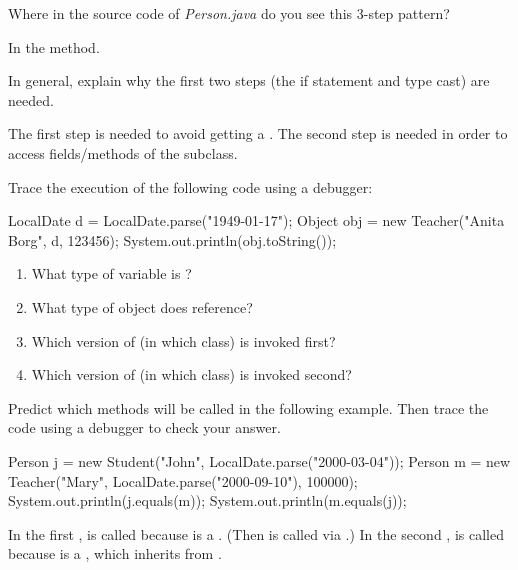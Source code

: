 \Q Where in the source code of \textit{Person.java} do you see this 3-step pattern?

\begin{answer}[1em]
In the  method.
\end{answer}


\Q \label{key2}
In general, explain why the first two steps (the if statement and type cast) are needed.

\begin{answer}[3em]
The first step is needed to avoid getting a .
The second step is needed in order to access fields/methods of the subclass.
\end{answer}


\Q Trace the execution of the following code using a debugger:

\begin{javalst}
LocalDate d = LocalDate.parse("1949-01-17");
Object obj = new Teacher("Anita Borg", d, 123456);
System.out.println(obj.toString());
\end{javalst}

\setlength{\defaultwidth}{6em}

\vspace{-1ex}
\begin{enumerate}
\item What type of variable is ?

\item What type of object does  reference?

\item Which version of  (in which class) is invoked first?

\item Which version of  (in which class) is invoked second?
\end{enumerate}
\vspace{-1ex}


\Q Predict which  methods will be called in the following example.
Then trace the code using a debugger to check your answer.

\begin{javalst}
Person j = new Student("John", LocalDate.parse("2000-03-04"));
Person m = new Teacher("Mary", LocalDate.parse("2000-09-10"), 100000);
System.out.println(j.equals(m));
System.out.println(m.equals(j));
\end{javalst}

\begin{answer}
In the first ,  is called because  is a .
(Then  is called via .)
In the second ,  is called because  is a , which inherits  from .
\end{answer}


